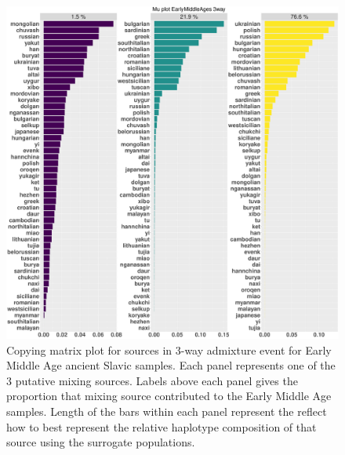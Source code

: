 \begin{figure}[htp]
    \centering
    \includegraphics[width=1.0\textwidth]{../images/chapter5/Mu_plot_EarlyMiddleAges_3way.pdf}
    \caption{Copying matrix plot for sources in 3-way admixture event for Early Middle Age ancient Slavic samples. Each panel represents one of the 3 putative mixing sources. Labels above each panel gives the proportion that mixing source contributed to the Early Middle Age samples. Length of the bars within each panel represent the reflect how to best represent the relative haplotype composition of that source using the surrogate populations.}
    \label{fig:EarlyMiddleAges_MOSAIC_3way_moderns_Mu}
\end{figure}

